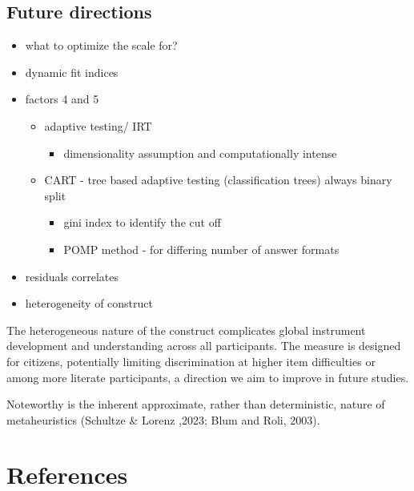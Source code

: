 \documentclass[
  12pt,
  a4paper,
  twoside]{article}
\providecommand{\tightlist}{%
  \setlength{\itemsep}{0pt}\setlength{\parskip}{0pt}}
\begin{document}
\subsection{Future directions}\label{future-directions}

\begin{itemize}
\tightlist
\item
  what to optimize the scale for?
\item
  dynamic fit indices
\item
  factors 4 and 5

  \begin{itemize}
  \tightlist
  \item
    adaptive testing/ IRT

    \begin{itemize}
    \tightlist
    \item
      dimensionality assumption and computationally intense
    \end{itemize}
  \item
    CART - tree based adaptive testing (classification trees) always binary split

    \begin{itemize}
    \tightlist
    \item
      gini index to identify the cut off
    \item
      POMP method - for differing number of answer formats
    \end{itemize}
  \end{itemize}
\item
  residuals correlates
\item
  heterogeneity of construct
\end{itemize}

The heterogeneous nature of the construct complicates global instrument development and understanding across all participants. The measure is designed for citizens, potentially limiting discrimination at higher item difficulties or among more literate participants, a direction we aim to improve in future studies.

Noteworthy is the inherent approximate, rather than deterministic, nature of metaheuristics (Schultze \& Lorenz ,2023; Blum and Roli, 2003).

\section*{References}\label{references}
\end{document}
